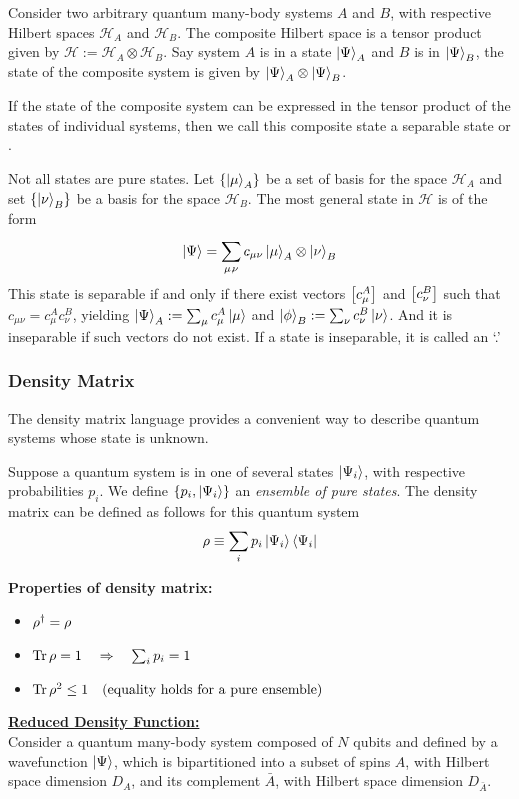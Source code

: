 \documentclass[11pt, oneside, listof=totoc]{scrbook}
\renewcommand{\H}{\mathcal{H}}
\begin{document}
Consider two arbitrary quantum many-body systems $A$ and $B$, with respective Hilbert spaces \(\H_{A}\) and \(\H_{B}\). The composite Hilbert space is a tensor product given by \(\H:= \H_{A} \otimes \H_{B}\). Say system \(A\) is in a state \(\ket{\Psi}_A\) and \(B\) is in \(\ket{\Psi}_B\), the state of the composite system is given by \(\ket{\Psi}_A \otimes \ket{\Psi}_B\).
\begin{remark}
    If the state of the composite system can be expressed in the tensor product of the states of individual systems, then we call this composite state a separable state or .

    \noindent Not all states are pure states. Let \(\qty{\ket{\mu}_A}\) be a set of basis for the space \(\H_A\) and set \(\qty{\ket{\nu}_B}\) be a basis for the space \(\H_B\). The most general state in \(\H\) is of the form
    \begin{equation}\label{eq:tensor_state}
        \ket{\Psi} = \sum_{\mu,\!\nu}^{} c_{\mu \nu} \ket{\mu}_A \otimes \ket{\nu}_B
    \end{equation}
    This state is separable if and only if there exist vectors \(\qty[c_{\mu}^{A}]\) and \(\qty[c_{\nu}^{B}]\) such that \(c_{\mu \nu} = c_{\mu}^{A} c_{\nu}^{B}\), yielding \(\ket{\Psi}_A:= \sum_{\mu} c_{\mu}^{A} \ket{\mu}\) and \(\ket{\phi}_B:= \sum_{\nu} c_{\nu}^{B} \ket{\nu}\). And it is inseparable if such vectors do not exist. If a state is inseparable, it is called an `.'
\end{remark}

\subsubsection{Density Matrix}

The density matrix language provides a convenient way to describe quantum systems whose state is unknown.
\begin{definition}
    Suppose a quantum system is in one of several states \(\ket{\Psi_i}\), with respective probabilities \(p_i\). We define \(\qty{p_i, \ket{\Psi_i}}\) an \emph{ensemble of pure states}. The density matrix can be defined as follows for this quantum system
    \[
        \rho \equiv \sum_{i} p_i \ket{\Psi_i} \bra{\Psi_i}
    \]
\end{definition}
{\bfseries Properties of density matrix:}
\begin{itemize}[noitemsep]
    \item \(\rho^\dagger = \rho\)
    \item \(\Tr\rho = 1 \quad \Rightarrow \quad \sum_{i} p_i = 1\)
    \item \(\Tr \rho^2 \le 1 \quad (\text{equality holds for a pure ensemble})\)
\end{itemize}
{\bfseries \uline{Reduced Density Function:}}\\
Consider a quantum many-body system composed of \(N\) qubits and defined by a wavefunction \(\ket{\Psi}\), which is bipartitioned into a subset of spins \(A\), with Hilbert space dimension \(D_{A}\), and its complement \(\bar{A}\), with Hilbert space dimension \(D_{\bar{A}}\).
\end{document}
